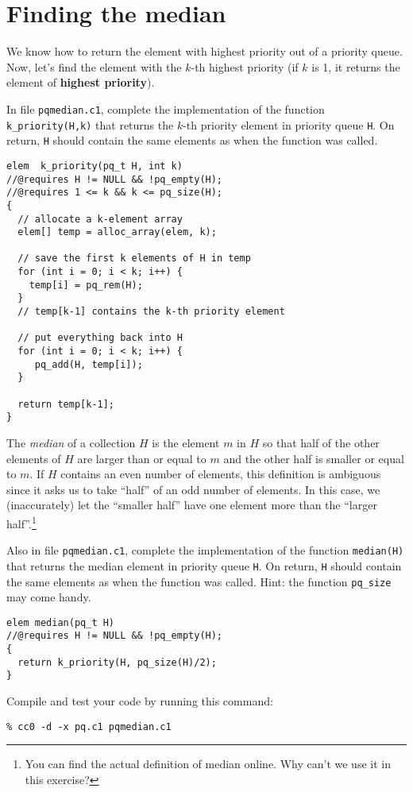 \section*{Finding the median}

We know how to return the element with highest priority out of a
priority queue.  Now, let's find the element with the $k$-th highest
priority (if $k$ is 1, it returns the element of \textbf{highest priority}).

\begin{part}
  In file \lstinline'pqmedian.c1', complete the implementation of the
  function \lstinline'k_priority(H,k)' that returns the $k$-th
  priority element in priority queue \lstinline'H'.  On return,
  \lstinline'H' should contain the same elements as when the function
  was called.
\begin{solution}
\begin{lstlisting}
elem  k_priority(pq_t H, int k)
//@requires H != NULL && !pq_empty(H);
//@requires 1 <= k && k <= pq_size(H);
{
  // allocate a k-element array
  elem[] temp = alloc_array(elem, k);

  // save the first k elements of H in temp
  for (int i = 0; i < k; i++) {
    temp[i] = pq_rem(H);
  }
  // temp[k-1] contains the k-th priority element

  // put everything back into H
  for (int i = 0; i < k; i++) {
     pq_add(H, temp[i]);
  }

  return temp[k-1];
}
\end{lstlisting}
\end{solution}
\end{part}


The \emph{median} of a collection $H$ is the element $m$
in $H$ so that half of the other elements of $H$ are larger than or
equal to $m$ and the other half is smaller or equal to $m$.  If $H$
contains an even number of elements, this definition is ambiguous
since it asks us to take ``half'' of an odd number of elements.  In
this case, we (inaccurately) let the ``smaller half''
have one element more than the ``larger half''.\footnote{You can find
  the actual definition of median online.  Why can't we use it in this
  exercise?}


\begin{part}
  Also in file \lstinline'pqmedian.c1', complete the implementation of
  the function \lstinline'median(H)' that returns the median element
  in priority queue \lstinline'H'.  On return, \lstinline'H' should
  contain the same elements as when the function was called.  Hint:
  the function \lstinline'pq_size' may come handy.
\begin{solution}
\begin{lstlisting}
elem median(pq_t H)
//@requires H != NULL && !pq_empty(H);
{
  return k_priority(H, pq_size(H)/2);
}

\end{lstlisting}
\end{solution}
\end{part}

Compile and test your code by running this command:

\lstinline[language={[coin]C}]'%

\threePT